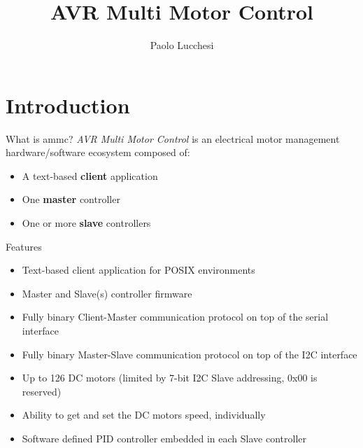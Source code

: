 \documentclass{beamer}
\title{AVR Multi Motor Control}
\author{Paolo Lucchesi}
\date{}
\begin{document}
\frame{\titlepage}

\hypertarget{introduction}{%
\section{Introduction}\label{introduction}}

\begin{frame}{What is ammc?}
\emph{AVR Multi Motor Control} is an electrical motor management
hardware/software ecosystem composed of:

\begin{itemize}
  \item A text-based \textbf{client} application
  \item One \textbf{master} controller
  \item One or more \textbf{slave} controllers
\end{itemize}
\end{frame}

\begin{frame}{Features}
\begin{itemize}
  \item Text-based client application for POSIX environments
  \item Master and Slave(s) controller firmware
  \item Fully binary Client-Master communication protocol on top of the serial
    interface
  \item Fully binary Master-Slave communication protocol on top of the I2C
    interface
  \item Up to 126 DC motors (limited by 7-bit I2C Slave addressing, 0x00 is
    reserved)
  \item Ability to get and set the DC motors speed, individually
  \item Software defined PID controller embedded in each Slave controller
\end{itemize}
\end{frame}
\end{document}
